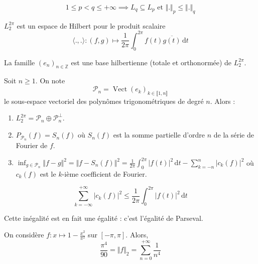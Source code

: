   \begin{remark}
    \[ 1 \leq p < q \leq +\infty \implies L_q \subseteq L_p \text{ et } \Vert . \Vert_p \leq \Vert . \Vert_q \]
  \end{remark}

  \begin{proposition}
    $L_2^{2\pi}$ est un espace de Hilbert pour le produit scalaire
    \[ \langle ., . \rangle : (f, g) \mapsto \frac{1}{2 \pi} \int_0^{2\pi} f(t) \overline{g(t)} \, \mathrm{d}t \]
  \end{proposition}


  \begin{theorem}
    La famille $(e_n)_{n \in \mathbb{Z}}$ est une base hilbertienne (totale et orthonormée) de $L_2^{2 \pi}$.
  \end{theorem}


  \begin{corollary}
    Soit $n \geq 1$. On note \[ \mathcal{P}_n = \operatorname{Vect}(e_k)_{k \in \llbracket 1, n \rrbracket} \]
    le sous-espace vectoriel des polynômes trigonométriques de degré $n$. Alors :
    \begin{enumerate}[label=(\roman*)]
      \item $L_2^{2\pi} = \mathcal{P}_n \oplus \mathcal{P}_n^\perp$.
      \item $P_{\mathcal{P}_n}(f) = S_n(f)$
      où $S_n(f)$ est la somme partielle d'ordre $n$ de la série de Fourier de $f$.
      \item $\inf_{g \in \mathcal{P}_n} \Vert f-g \Vert^2 = \Vert f-S_n(f) \Vert^2 = \frac{1}{2\pi} \int_0^{2\pi} \vert f(t) \vert^2 \, \mathrm{d}t - \sum_{k=-n}^{n} \vert c_k(f) \vert^2$
      où $c_k(f)$ est le $k$-ième coefficient de Fourier.
    \end{enumerate}
  \end{corollary}

  \begin{application}
    \[ \sum_{k=-\infty}^{+\infty} \vert c_k(f) \vert^2 \leq \frac{1}{2\pi} \int_0^{2\pi} \vert f(t) \vert^2 \, \mathrm{d}t \]
  \end{application}

  \begin{remark}
    Cette inégalité est en fait une égalité : c'est l'égalité de Parseval.
  \end{remark}

  \begin{example}
    On considère $f : x \mapsto 1 - \frac{x^2}{\pi^2}$ sur $[-\pi, \pi]$. Alors,
    \[ \frac{\pi^4}{90} = \Vert f \Vert_2 = \sum_{n=0}^{+\infty} \frac{1}{n^4} \]
  \end{example}


